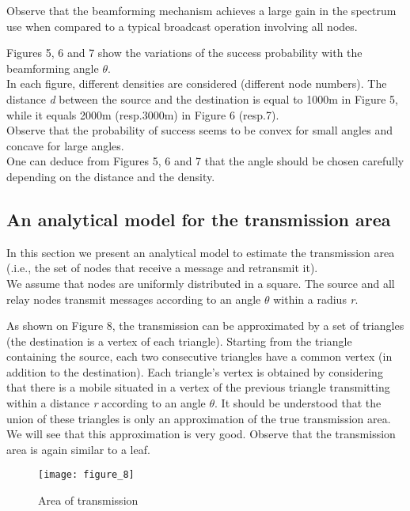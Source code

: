 \documentclass{IEEEtran}
\begin{document}
Observe that the beamforming mechanism achieves a large gain in the
spectrum use when compared to a typical broadcast operation
involving all nodes.

Figures 5, 6 and 7 show the variations of the success probability
with the beamforming angle $\theta$.\\
In each figure, different densities are considered (different node
numbers). The distance \emph{d} between the source and the
destination is equal to 1000m in Figure 5, while it equals 2000m
(resp.3000m) in Figure 6 (resp.7).\\
Observe that the probability of success seems to be convex for small
angles and concave for large angles. \\
One can deduce from Figures 5, 6 and 7 that the angle should be
chosen carefully depending on the distance and the density.

\subsection{An analytical model for the transmission area}


In this section we present an analytical model to estimate the
transmission area (.i.e., the set of nodes that receive a message
and retransmit it). \\
We assume that nodes are uniformly distributed in a square. The
source and all relay nodes transmit messages according to an angle
$\theta$ within a radius \emph{r}.

As shown on Figure 8, the transmission can be approximated by a set
of triangles (the destination is a vertex of each triangle).
Starting from the triangle containing the source, each two
consecutive triangles have a common vertex (in addition to the
destination). Each triangle's vertex is obtained by considering that
there is a mobile situated in a vertex of the previous triangle
transmitting within a distance \emph{r} according to an angle
$\theta$. It should be understood that the union of these triangles
is only an approximation of the true transmission area. We will see
that this approximation is very good.  Observe that the transmission
area is again similar to a leaf.

\begin{figure}[!htbp]
  \begin{center}
\texttt{[image: figure\_8]}
  \end{center}
  \caption{Area of transmission}
\end{figure}
\end{document}
